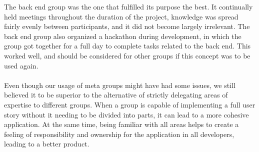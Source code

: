 The back end group was the one that fulfilled its purpose the best.
It continually held meetings throughout the duration of the project, knowledge was spread fairly evenly between participants, and it did not become largely irrelevant.
The back end group also organized a hackathon during development, in which the group got together for a full day to complete tasks related to the back end.
This worked well, and should be considered for other groups if this concept was to be used again.
\\\\
Even though our usage of meta groups might have had some issues, we still believed it to be superior to the alternative of strictly delegating areas of expertise to different groups.
When a group is capable of implementing a full user story without it needing to be divided into parts, it can lead to a more cohesive application.
At the same time, being familiar with all areas helps to create a feeling of responsibility and ownership for the application in all developers, leading to a better product.
